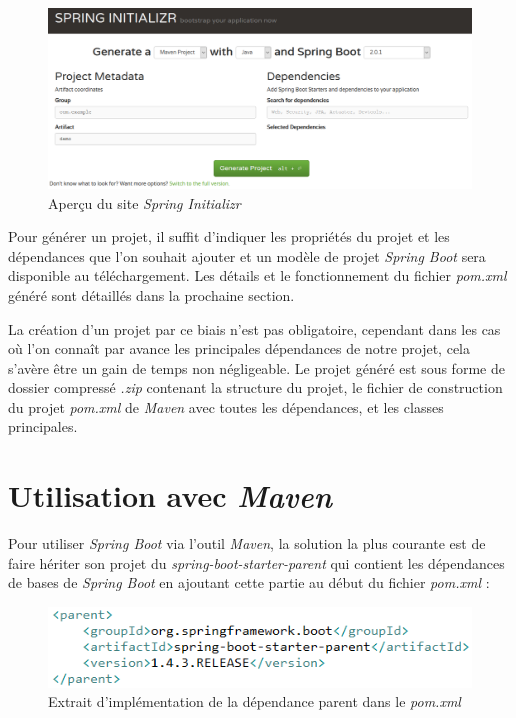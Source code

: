\documentclass{polytech/polytech}
\begin{document}
\begin{figure}
	\includegraphics[scale=0.5]{images/springInitializr}
	\caption{Aperçu du site \textit{Spring Initializr}}
	\label{fig:initializr}
\end{figure}

Pour générer un projet, il suffit d’indiquer les propriétés du projet et les dépendances que l’on souhait ajouter et un modèle de projet \textit{Spring Boot} sera disponible au téléchargement. Les détails et le fonctionnement du fichier \textit{pom.xml} généré sont détaillés dans la prochaine section. 

La création d'un projet par ce biais n'est pas obligatoire, cependant dans les cas où l'on connaît par avance les principales dépendances de notre projet, cela s'avère être un gain de temps non négligeable. Le projet généré est sous forme de dossier compressé \textit{.zip} contenant la structure du projet, le fichier de construction du projet \textit{pom.xml} de \textit{Maven} avec toutes les dépendances, et les classes principales. 


\section{Utilisation avec \textit{Maven}}
\label{sec:utilisationMaven}


Pour utiliser \textit{Spring Boot} via l’outil \textit{Maven}, la solution la plus courante est de faire hériter son projet du \textit{spring-boot-starter-parent} qui contient les dépendances de bases de \textit{Spring Boot} en ajoutant cette partie au début du fichier \textit{pom.xml} :

\begin{figure}
	\includegraphics[scale=0.75]{images/parentSpringBoot}
	\caption{Extrait d'implémentation de la dépendance parent dans le \textit{pom.xml}}
	\label{fig:parentSpringBoot}
\end{figure}
\end{document}
